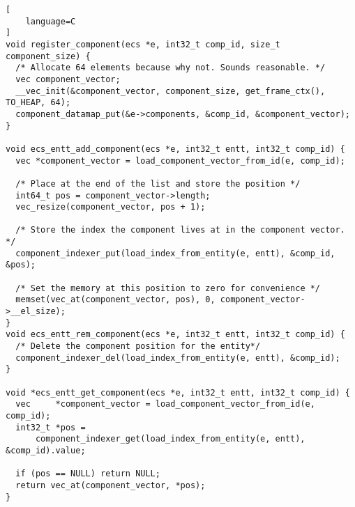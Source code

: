 \begin{lstlisting}[
    language=C
]
void register_component(ecs *e, int32_t comp_id, size_t component_size) {
  /* Allocate 64 elements because why not. Sounds reasonable. */
  vec component_vector;
  __vec_init(&component_vector, component_size, get_frame_ctx(), TO_HEAP, 64);
  component_datamap_put(&e->components, &comp_id, &component_vector);
}

void ecs_entt_add_component(ecs *e, int32_t entt, int32_t comp_id) {
  vec *component_vector = load_component_vector_from_id(e, comp_id);

  /* Place at the end of the list and store the position */
  int64_t pos = component_vector->length;
  vec_resize(component_vector, pos + 1);

  /* Store the index the component lives at in the component vector. */
  component_indexer_put(load_index_from_entity(e, entt), &comp_id, &pos);

  /* Set the memory at this position to zero for convenience */
  memset(vec_at(component_vector, pos), 0, component_vector->__el_size);
}
void ecs_entt_rem_component(ecs *e, int32_t entt, int32_t comp_id) {
  /* Delete the component position for the entity*/
  component_indexer_del(load_index_from_entity(e, entt), &comp_id);
}

void *ecs_entt_get_component(ecs *e, int32_t entt, int32_t comp_id) {
  vec     *component_vector = load_component_vector_from_id(e, comp_id);
  int32_t *pos =
      component_indexer_get(load_index_from_entity(e, entt), &comp_id).value;

  if (pos == NULL) return NULL;
  return vec_at(component_vector, *pos);
}
\end{lstlisting}

